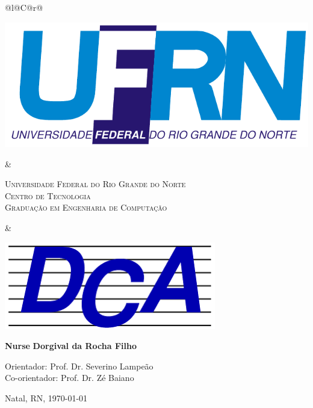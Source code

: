 %
%

\begin{titlepage}

\begin{center}

\small

\begin{tabularx}{\linewidth}{@{}l@{}C@{}r@{}}
\parbox[c]{3cm}{\includegraphics[width=\linewidth]{./figuras/UFRN}} &
\begin{center}
\textsf{\textsc{Universidade Federal do Rio Grande do Norte\\
Centro de Tecnologia\\
Graduação em Engenharia de Computação}}
\end{center} &
\parbox[c]{3cm}{\includegraphics[width=\linewidth]{./figuras/dca_logo.png}}
\end{tabularx}

\vfill
\LARGE
\textbf{Nurse}
\vfill
\Large
\textbf{Dorgival da Rocha Filho}
\vfill

\normalsize

Orientador: Prof. Dr. Severino Lampeão
\\[2ex] Co-orientador: Prof. Dr. Zé Baiano %

\vfill

\hfill


\vfill

\large

Natal, RN, \today

\end{center}

\end{titlepage}